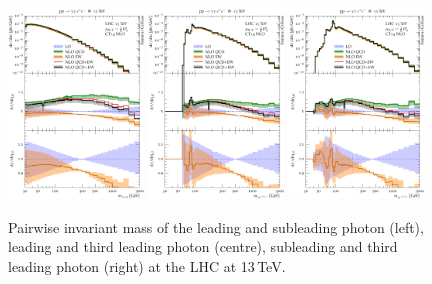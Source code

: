 \begin{figure}[t!]
  \centering
  \includegraphics[width=0.32\textwidth]{figs_aaz/m_y1y2_comb_log}
  \includegraphics[width=0.32\textwidth]{figs_aaz/m_y1l1l2_comb_log}
  \includegraphics[width=0.32\textwidth]{figs_aaz/m_y2l1l2_comb_log}
  \caption{
    Pairwise invariant mass of the leading and subleading photon (left),
    leading and third leading photon (centre), subleading and third leading 
    photon (right) at the LHC at 13\,TeV.\\
    \label{fig:aaz:myy}
  }
\end{figure}

